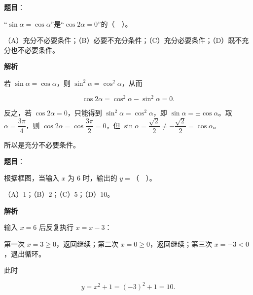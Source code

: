 \begin{answer}

\textbf{题目}：

“$\sin\alpha=\cos\alpha$”是“$\cos 2\alpha=0$”的（　）。

（A）充分不必要条件；（B）必要不充分条件；（C）充分必要条件；（D）既不充分也不必要条件。

\textbf{解析}

若 $\sin\alpha=\cos\alpha$，则 $\sin^{2}\alpha=\cos^{2}\alpha$，从而

\nopagebreak[4]
\[
\cos 2\alpha=\cos^{2}\alpha-\sin^{2}\alpha=0.
\]

反之，若 $\cos 2\alpha=0$，只能得到 $\sin^{2}\alpha=\cos^{2}\alpha$，即 $\sin\alpha=\pm\cos\alpha$。取 $\alpha=\dfrac{3\pi}{4}$，则 $\cos 2\alpha=\cos\dfrac{3\pi}{2}=0$，但 $\sin\alpha=\dfrac{\sqrt{2}}{2}\ne-\dfrac{\sqrt{2}}{2}=\cos\alpha$。

所以是充分不必要条件。


\end{answer}
\begin{answer}

\textbf{题目}：

根据框图，当输入 $x$ 为 $6$ 时，输出的 $y=$（　）。
\nopagebreak[4]
\begin{center}\end{center}
\nopagebreak[4]
（A）$1$；（B）$2$；（C）$5$；（D）$10$。

\textbf{解析}

输入 $x=6$ 后反复执行 $x=x-3$：

第一次 $x=3\ge 0$，返回继续；第二次 $x=0\ge 0$，返回继续；第三次 $x=-3<0$，退出循环。

此时

\nopagebreak[4]
\[
y=x^{2}+1=(-3)^{2}+1=10.
\]


\end{answer}
